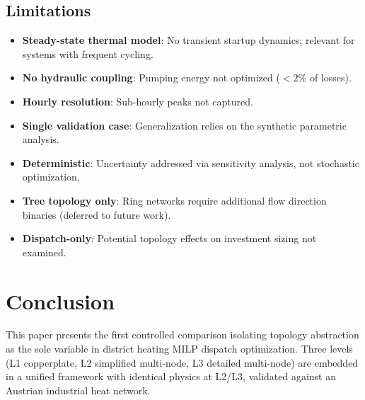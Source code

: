\documentclass[review,3p]{elsarticle}
\begin{document}
\subsection{Limitations}
\label{sec:discussion_limitations}

\begin{itemize}[nosep]
    \item \textbf{Steady-state thermal model}: No transient startup
    dynamics; relevant for systems with frequent cycling.
    \item \textbf{No hydraulic coupling}: Pumping energy not optimized
    ($<$2\% of losses).
    \item \textbf{Hourly resolution}: Sub-hourly peaks not captured.
    \item \textbf{Single validation case}: Generalization relies on
    the synthetic parametric analysis.
    \item \textbf{Deterministic}: Uncertainty addressed via sensitivity
    analysis, not stochastic optimization.
    \item \textbf{Tree topology only}: Ring networks require additional
    flow direction binaries (deferred to future work).
    \item \textbf{Dispatch-only}: Potential topology effects on
    investment sizing not examined.
\end{itemize}

\section{Conclusion}
\label{sec:conclusion}

This paper presents the first controlled comparison isolating topology
abstraction as the sole variable in district heating MILP dispatch
optimization. Three levels (L1 copperplate, L2 simplified multi-node,
L3 detailed multi-node) are embedded in a unified framework with
identical physics at L2/L3, validated against an Austrian industrial
heat network.
\end{document}
